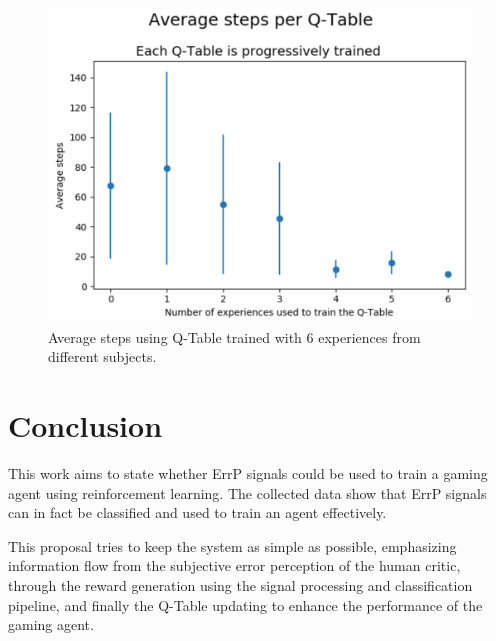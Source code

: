 \documentclass[journal]{IEEEtran}
\begin{document}
{{\begin{figure}[h!]
\centering
\includegraphics[scale=0.4]{Images/Average_steps/all.png}
\caption{Average steps using Q-Table trained with 6 experiences from different subjects.}
\label{fig:avg_steps_all}
\end{figure}

\section{Conclusion}
\label{conclusions}


This work aims to state whether ErrP signals could be used to train a gaming agent using reinforcement learning. The collected data show that ErrP signals can in fact be classified and used to train an agent effectively. 

This proposal tries to keep the system as simple as possible, emphasizing information flow from the subjective error perception of the human critic, through the reward generation using the signal processing and classification pipeline, and finally the Q-Table updating  to enhance the performance of the gaming agent.


}}
\end{document}
